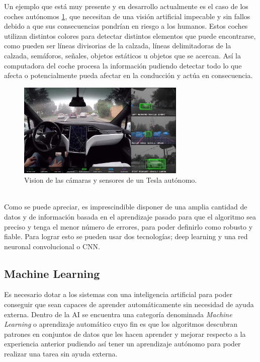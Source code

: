 Un ejemplo que está muy presente y en desarrollo actualmente es el caso de los coches autónomos \ref{fig:tesla}, que necesitan de una visión artificial impecable y sin fallos debido a que sus consecuencias pondrían en riesgo a los humanos. Estos coches utilizan distintos colores para detectar distintos elementos que puede encontrarse, como pueden ser líneas divisorias de la calzada, líneas delimitadoras de la calzada, semáforos, señales, objetos estáticos u objetos que se acercan. Así la computadora del coche procesa la información pudiendo detectar todo lo que afecta o potencialmente pueda afectar en la conducción y actúa en consecuencia.
\begin{figure} [h!]
  \begin{center}
    \includegraphics[width=8cm]{figs/coche_autonomo}
  \end{center}
  \caption[]{Vision de las cámaras y sensores de un Tesla autónomo. \footnotemark}
  \label{fig:tesla}
\end{figure}\\
Como se puede apreciar, es imprescindible disponer de una amplia cantidad de datos y de información basada en el aprendizaje pasado para que el algoritmo sea preciso y tenga el menor número de errores, para poder definirlo como robusto y fiable. Para lograr esto se pueden usar dos tecnologías; deep learning y una red neuronal convolucional o CNN.\\

\subsection{Machine Learning}
Es necesario dotar a los sistemas con una inteligencia artificial para poder conseguir que sean capaces de aprender automáticamente sin necesidad de ayuda externa. Dentro de la AI se encuentra una categoría denominada \textit{Machine Learning} o aprendizaje automático cuyo fin es que los algoritmos descubran patrones en conjuntos de datos que les hacen aprender y mejorar respecto a la experiencia anterior pudiendo así tener un aprendizaje autónomo para poder realizar una tarea sin ayuda externa.\\

